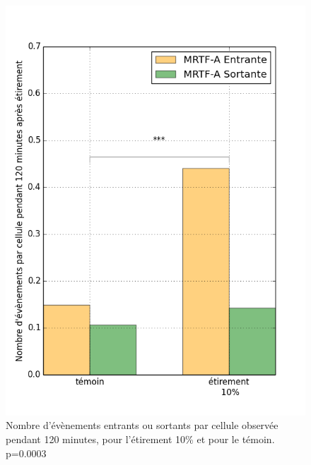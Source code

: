 \documentclass                                                                                                                                                                                                                                                                                                                                       {report}
\begin{document}
\begin{figure}[p]
\includegraphics[scale=0.4]{Figures/Etirement10_vs_temoin_activite.png} 
\caption{\label{activite_Et10} Nombre d'évènements entrants ou sortants par cellule observée pendant 120 minutes, pour l'étirement 10\% et pour le témoin. p=0.0003 }
\end{figure}
\end{document}
